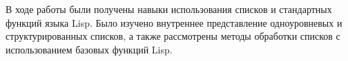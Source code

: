 \Conclusion

В ходе работы были получены навыки использования списков и стандартных функций языка Lisp. Было изучено внутреннее представление одноуровневых и структурированных списков, а также рассмотрены методы обработки списков с использованием базовых функций Lisp.
